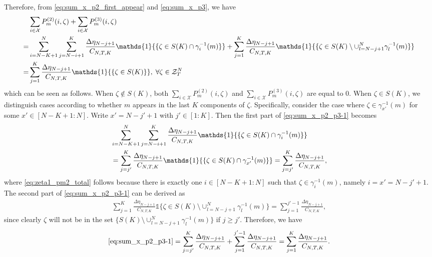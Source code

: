 \documentclass[11pt,letterpaper]{article}
\newcommand{\cX}{\mathcal{X}}
\newcommand{\cZ}{\mathcal{Z}}
\begin{document}
Therefore, from \eqref{eq:sum_x_p2_first_appear} and \eqref{eq:sum_x_p3}, we have
\begin{align}
     & \sum_{i \in \cX} P^{(2)}_m(i, \zeta) +\sum_{i \in \cX}P^{(3)}_m(i, \zeta) \notag \\
     = & \sum_{i=N-K+1}^N \sum_{j=N-i+1}^{K}  \frac{\Delta\eta_{N-j+1}}{C_{N,T,K}}\mathds{1}{\{ \zeta \in S(K) \cap \gamma_{i}^{-1}(m)\}} +  \sum_{j=1}^K \frac{\Delta\eta_{N-j+1}}{C_{N,T,K}}\mathds{1}{\{ \zeta \in S(K) \setminus \cup_{l= N-j+1}^N \gamma^{-1}_l(m)\}} \label{eq:sum_x_p2_p3-1}\\
    = & \sum_{j=1}^K \frac{\Delta\eta_{N-j+1}}{C_{N,T,K}} \mathds{1} {\{\zeta \in S(K)\}}, \; \forall \zeta \in \cZ^N_T \label{eq:sum_x_p2_p3-2}
\end{align}
which can be seen as follows. When $\zeta \notin S(K)$, both $\sum_{i \in \cX} P^{(2)}_m(i, \zeta)$ and $\sum_{i \in \cX} P^{(3)}_m(i, \zeta)$ are equal to $0$. When $\zeta \in S(K)$, we distinguish cases according to whether $m$ appears in the last $K$ components of $\zeta$. Specifically, consider the case where $\zeta \in \gamma^{-1}_{x'}(m)$ for some $x' \in [N-K+1:N]$. Write $x' = N - j' + 1$ with $j' \in [1:K]$. Then the first part of \eqref{eq:sum_x_p2_p3-1} becomes
\begin{align}
     & \sum_{i=N-K+1}^N \sum_{j=N-i+1}^{K}  \frac{\Delta\eta_{N-j+1}}{C_{N,T,K}}\mathds{1}{\{ \zeta \in S(K) \cap \gamma_{i}^{-1}(m)\}} \notag \\
     & =  \sum_{j=j'}^{K}  \frac{\Delta\eta_{N-j+1}}{C_{N,T,K}}\mathds{1}{\{ \zeta \in S(K) \cap \gamma_{x'}^{-1}(m)\}} 
       = \sum_{j=j'}^{K}  \frac{\Delta\eta_{N-j+1}}{C_{N,T,K}}, \label{eq:zeta1_pm2_total}
\end{align}
where \eqref{eq:zeta1_pm2_total} follows because there is exactly one $i \in [N-K+1:N]$ such that $\zeta \in \gamma^{-1}_{i}(m)$, namely $i = x' = N - j' + 1$.
The second part of \eqref{eq:sum_x_p2_p3-1} can be derived as 
\begin{align}
    \sum_{j=1}^K \frac{\Delta\eta_{N-j+1}}{C_{N,T,K}}\mathds{1}{\{ \zeta \in S(K) \setminus \cup_{l= N-j+1}^N \gamma^{-1}_l(m)\}} = \sum_{j=1}^{j'-1} \frac{\Delta\eta_{N-j+1}}{C_{N,T,K}},
\end{align}
since clearly $\zeta$ will not be in the set $\{ S(K) \setminus \cup_{l= N-j+1}^N \gamma^{-1}_l(m)\}$ if $j \geq j'$. Therefore, we have 
\begin{align}
     \eqref{eq:sum_x_p2_p3-1} = \sum_{j=j'}^{K}  \frac{\Delta\eta_{N-j+1}}{C_{N,T,K}} + \sum_{j=1}^{j'-1}  \frac{\Delta\eta_{N-j+1}}{C_{N,T,K}} = \sum_{j=1}^{K}  \frac{\Delta\eta_{N-j+1}}{C_{N,T,K}}.
\end{align}
\end{document}
